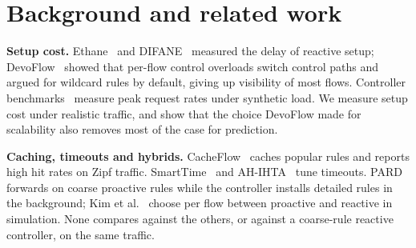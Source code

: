 \documentclass[conference]{IEEEtran}
\begin{document}
\section{Background and related work}\label{sec:related}

\textbf{Setup cost.} Ethane~\cite{ethane} and DIFANE~\cite{difane} measured the delay of reactive setup; DevoFlow~\cite{devoflow} showed that per-flow control overloads switch control paths and argued for wildcard rules by default, giving up visibility of most flows. Controller benchmarks~\cite{tootoonchian} measure peak request rates under synthetic load. We measure setup cost under realistic traffic, and show that the choice DevoFlow made for scalability also removes most of the case for prediction.

\textbf{Caching, timeouts and hybrids.} CacheFlow~\cite{cacheflow} caches popular rules and reports high hit rates on Zipf traffic. SmartTime~\cite{smarttime} and AH-IHTA~\cite{ahihta} tune timeouts. PARD~\cite{pard} forwards on coarse proactive rules while the controller installs detailed rules in the background; Kim et al.~\cite{kim2022} choose per flow between proactive and reactive in simulation. None compares against the others, or against a coarse-rule reactive controller, on the same traffic.
\end{document}
